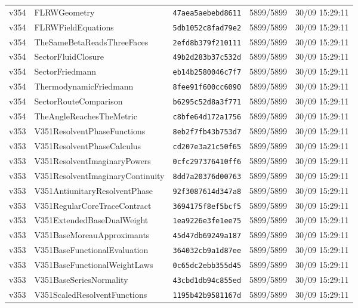 \documentclass[11pt]{article}
\theoremstyle{definition}\newtheorem{deriv}{Derivação}
\begin{document}
{\begin{longtable}{@{}lllll@{}}
v354 & FLRWGeometry & \texttt{47aea5aebebd8611} & 5899/5899 & 30/09 15:29:11 \\
v354 & FLRWFieldEquations & \texttt{5db1052c8fad79e2} & 5899/5899 & 30/09 15:29:11 \\
v354 & TheSameBetaReadsThreeFaces & \texttt{2efd8b379f210111} & 5899/5899 & 30/09 15:29:11 \\
v354 & SectorFluidClosure & \texttt{49b2d283b37c532d} & 5899/5899 & 30/09 15:29:11 \\
v354 & SectorFriedmann & \texttt{eb14b2580046c7f7} & 5899/5899 & 30/09 15:29:11 \\
v354 & ThermodynamicFriedmann & \texttt{8fee91f600cc6090} & 5899/5899 & 30/09 15:29:11 \\
v354 & SectorRouteComparison & \texttt{b6295c52d8a3f771} & 5899/5899 & 30/09 15:29:11 \\
v354 & TheAngleReachesTheMetric & \texttt{c8bfe64d172a1756} & 5899/5899 & 30/09 15:29:11 \\
v353 & V351ResolventPhaseFunctions & \texttt{8eb2f7fb43b753d7} & 5899/5899 & 30/09 15:29:11 \\
v353 & V351ResolventPhaseCalculus & \texttt{cd207e3a21c50f65} & 5899/5899 & 30/09 15:29:11 \\
v353 & V351ResolventImaginaryPowers & \texttt{0cfc297376410ff6} & 5899/5899 & 30/09 15:29:11 \\
v353 & V351ResolventImaginaryContinuity & \texttt{8dd7a20376d00763} & 5899/5899 & 30/09 15:29:11 \\
v353 & V351AntiunitaryResolventPhase & \texttt{92f3087614d347a8} & 5899/5899 & 30/09 15:29:11 \\
v353 & V351RegularCoreTraceContract & \texttt{3694175f8ef5bcf5} & 5899/5899 & 30/09 15:29:11 \\
v353 & V351ExtendedBaseDualWeight & \texttt{1ea9226e3fe1ee75} & 5899/5899 & 30/09 15:29:11 \\
v353 & V351BaseMoreauApproximants & \texttt{45d47db69249a187} & 5899/5899 & 30/09 15:29:11 \\
v353 & V351BaseFunctionalEvaluation & \texttt{364032cb9a1d87ee} & 5899/5899 & 30/09 15:29:11 \\
v353 & V351BaseFunctionalWeightLaws & \texttt{0c65dc2ebb355d45} & 5899/5899 & 30/09 15:29:11 \\
v353 & V351BaseSeriesNormality & \texttt{43cbd1db94c855ed} & 5899/5899 & 30/09 15:29:11 \\
v353 & V351ScaledResolventFunctions & \texttt{1195b42b9581167d} & 5899/5899 & 30/09 15:29:11 \\

\end{longtable}}
\end{document}
